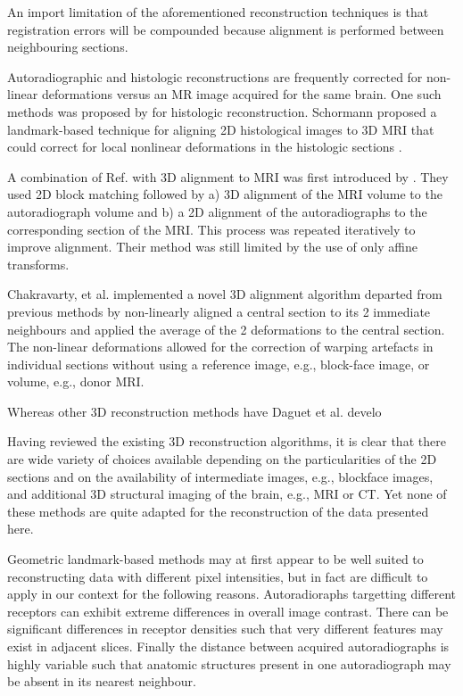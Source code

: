 \documentclass[12pt]{article}
\begin{document}
An import limitation of the aforementioned reconstruction techniques is that registration errors will be compounded because alignment is performed between neighbouring sections. 

Autoradiographic and histologic reconstructions are frequently corrected for non-linear deformations versus an MR image acquired for the same brain. One such methods was proposed by \cite{Schormann1993} for histologic reconstruction. Schormann proposed a landmark-based technique for aligning 2D histological images to 3D MRI that could correct for local nonlinear deformations in the histologic sections \cite{Shormann1995}. 

A combination of Ref. \cite{Ourselin2001} with 3D alignment to MRI was first introduced by \cite{Malandain2004}. They used 2D block matching followed by a) 3D alignment of the MRI volume to the autoradiograph volume and b) a 2D alignment of the autoradiographs to the corresponding section of the MRI. This process was repeated iteratively to improve alignment. Their method was still limited by the use of only affine transforms. 

Chakravarty, et al. \cite{Chakravarty2003,Chakravarty2005} implemented a novel 3D alignment algorithm departed from previous methods by non-linearly aligned a central section to its 2 immediate neighbours and applied the average of the 2 deformations to the central section. The non-linear deformations allowed for the correction of warping artefacts in individual sections without using a reference image, e.g., block-face image, or volume, e.g., donor MRI. 

Whereas other 3D reconstruction methods have Daguet et al. develo

Having reviewed the existing 3D reconstruction algorithms, it is clear that there are wide variety of choices available depending on the particularities of the 2D sections and on the availability of intermediate images, e.g., blockface images, and additional 3D structural imaging of the brain, e.g., MRI or CT. Yet none of these methods are quite adapted for the reconstruction of the data presented here.

Geometric landmark-based methods may at first appear to be well suited to reconstructing data with different pixel intensities, but in fact are difficult to apply in our context for the following reasons. Autoradioraphs targetting different receptors can exhibit extreme differences in overall image contrast. There can be significant differences in receptor densities such that very different features may exist in adjacent slices. Finally the distance between acquired autoradiographs is highly variable such that anatomic structures present in one autoradiograph may be absent in its nearest neighbour.
\end{document}
